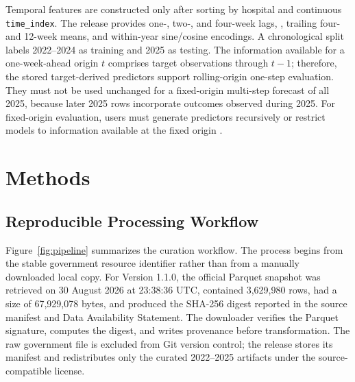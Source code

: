 \documentclass[data,datadescriptor,submit,moreauthors,pdftex]{Definitions/mdpi}
\begin{document}
\begingroup\sloppy
Temporal features are constructed only after sorting by hospital and continuous \texttt{time\_index}. The release provides one-, two-, and four-week lags, , trailing four- and 12-week means, and within-year sine/cosine encodings. A chronological split labels 2022--2024 as training and 2025 as testing. The information available for a one-week-ahead origin $t$ comprises target observations through $t-1$; therefore, the stored target-derived predictors support rolling-origin one-step evaluation. They must not be used unchanged for a fixed-origin multi-step forecast of all 2025, because later 2025 rows incorporate outcomes observed during 2025. For fixed-origin evaluation, users must generate predictors recursively or restrict models to information available at the fixed origin \citep{Hyndman2021}.
\endgroup

\section{Methods}
\label{sec:methods}

\subsection{Reproducible Processing Workflow}

Figure~\ref{fig:pipeline} summarizes the curation workflow. The process begins from the stable government resource identifier rather than from a manually downloaded local copy. For Version 1.1.0, the official Parquet snapshot was retrieved on 30 August 2026 at 23:38:36 UTC, contained 3,629,980 rows, had a size of 67,929,078 bytes, and produced the SHA-256 digest reported in the source manifest and Data Availability Statement. The downloader verifies the Parquet signature, computes the digest, and writes provenance before transformation. The raw government file is excluded from Git version control; the release stores its manifest and redistributes only the curated 2022--2025 artifacts under the source-compatible license.
\end{document}
